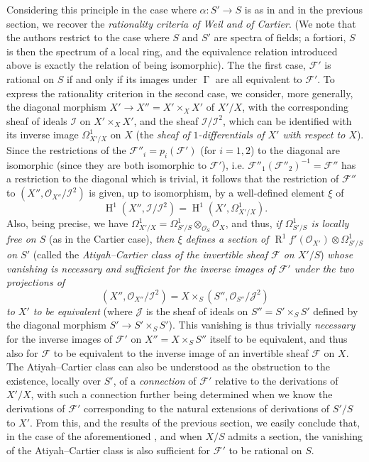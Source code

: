 Considering this principle in the case where $\alpha\colon S'\to S$ is as in  and  in the previous section, we recover the \emph{rationality criteria of Weil and of Cartier}.
(We note that the authors restrict to the case where $S$ and $S'$ are spectra of fields;
a fortiori, $S$ is then the spectrum of a local ring, and the equivalence relation introduced above is exactly the relation of being isomorphic).
The the first case, $\mathcal{F}'$ is rational on $S$ if and only if its images under $\operatorname{\Gamma}$ are all equivalent to $\mathcal{F}'$.
To express the rationality criterion in the second case, we consider, more generally, the diagonal morphism $X'\to X''=X'\times_X X'$ of $X'/X$, with the corresponding sheaf of ideals $\mathcal{I}$ on $X'\times_X X'$, and the sheaf $\mathcal{I}/\mathcal{I}^2$, which can be identified with its inverse image $\Omega_{X'/X}^1$ on $X$ (the \emph{sheaf of $1$-differentials of $X'$ with respect to $X$}).
Since the restrictions of the $\mathcal{F}''_i=p_i(\mathcal{F}')$ (for $i=1,2$) to the diagonal are isomorphic (since they are both isomorphic to $\mathcal{F}'$), i.e. $\mathcal{F}''_1(\mathcal{F}''_2)^{-1}=\mathcal{F}''$ has a restriction to the diagonal which is trivial, it follows that the restriction of $\mathcal{F}''$ to $(X'',\mathcal{O}_{X''}/\mathcal{I}^2)$ is given, up to isomorphism, by a well-defined element $\xi$ of
\[
    \operatorname{H}^1(X'',\mathcal{I}/\mathcal{I}^2)
    = \operatorname{H}^1(X',\Omega_{X'/X}^1).
\]
Also, being precise, we have $\Omega_{X'/X}^1=\Omega_{S'/S}^1\otimes_{\mathcal{O}_S}\mathcal{O}_X$, and thus, \emph{if $\Omega_{S'/S}^1$ is locally free on $S$} (as in the Cartier case), \emph{then $\xi$ defines a section of $\operatorname{R}^1f'(\mathcal{O}_{X'})\otimes\Omega_{S'/S}^1$ on $S'$} (called the \emph{Atiyah–Cartier class of the invertible sheaf $\mathcal{F}$ on $X'/S$}) \emph{whose vanishing is necessary and sufficient for the inverse images of $\mathcal{F}'$ under the two projections of}
\[
    (X'',\mathcal{O}_{X''}/\mathcal{I}^2)
    = X\times_S(S'',\mathcal{O}_{S''}/\mathcal{J}^2)
\]
\emph{to $X'$ to be equivalent} (where $\mathcal{J}$ is the sheaf of ideals on $S''=S'\times_S S'$ defined by the diagonal morphism $S'\to S'\times_S S'$).
This vanishing is thus trivially \emph{necessary} for the inverse images of $\mathcal{F}'$ on $X''=X\times_S S''$ itself to be equivalent, and thus also for $\mathcal{F}$ to be equivalent to the inverse image of an invertible sheaf $\mathcal{F}$ on $X$.
The Atiyah–Cartier class can also be understood as the obstruction to the existence, locally over $S'$, of a \emph{connection} of $\mathcal{F}'$ relative to the derivations of $X'/X$, with such a connection further being determined when we know the derivations of $\mathcal{F}'$ corresponding to the natural extensions of derivations of $S'/S$ to $X'$.
From this, and the results of the previous section, we easily conclude that, in the case of the aforementioned , and when $X/S$ admits a section, the vanishing of the Atiyah–Cartier class is also sufficient for $\mathcal{F}'$ to be rational on $S$.


